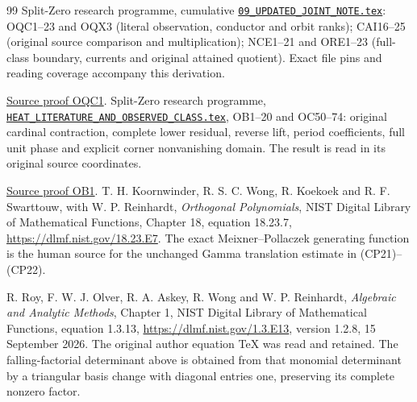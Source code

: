 \documentclass[11pt]{article}
\begin{document}
\begin{thebibliography}{99}
 Split-Zero research programme, cumulative
\href{https://github.com/KokunoYumeto/zeta-function-research-reader/blob/5992ad50c0f2a06921f1fcaded7b4e38097c0739/workbenches/splitzero-tandem/continuations/20260920-original-kernel-mixed-determinants/cumulative/09_UPDATED_JOINT_NOTE.tex\#L1}{\texttt{09\_UPDATED\_JOINT\_NOTE.tex}}: OQC1--23 and OQX3 (literal
observation, conductor and orbit ranks); CAI16--25 (original source
comparison and multiplication); NCE1--21 and ORE1--23 (full-class
boundary, currents and original attained quotient). Exact file pins
and reading coverage accompany this derivation.

\href{https://github.com/KokunoYumeto/zeta-function-research-reader/blob/5992ad50c0f2a06921f1fcaded7b4e38097c0739/workbenches/splitzero-tandem/continuations/20260920-original-kernel-mixed-determinants/cumulative/09_UPDATED_JOINT_NOTE.tex\#L11282}{Source proof OQC1}.
 Split-Zero research programme,
\href{https://github.com/KokunoYumeto/zeta-function-research-reader/blob/487253b5b01851da5b9b98af4e146fecf1fab902/workbenches/splitzero-tandem/continuations/20260920-heat-literature-observed-class/HEAT_LITERATURE_AND_OBSERVED_CLASS.tex\#L1}{\texttt{HEAT\_LITERATURE\_AND\_OBSERVED\_CLASS.tex}}, OB1--20 and
OC50--74: original cardinal contraction, complete lower residual,
reverse lift, period coefficients, full unit phase and explicit corner
nonvanishing domain. The result is read in its original source coordinates.

\href{https://github.com/KokunoYumeto/zeta-function-research-reader/blob/487253b5b01851da5b9b98af4e146fecf1fab902/workbenches/splitzero-tandem/continuations/20260920-heat-literature-observed-class/HEAT_LITERATURE_AND_OBSERVED_CLASS.tex\#L1223}{Source proof OB1}.
 T. H. Koornwinder, R. S. C. Wong, R. Koekoek and
R. F. Swarttouw, with W. P. Reinhardt, \emph{Orthogonal Polynomials},
NIST Digital Library of Mathematical Functions, Chapter 18,
equation 18.23.7, \url{https://dlmf.nist.gov/18.23.E7}.
The exact Meixner--Pollaczek generating function is the human source
for the unchanged Gamma translation estimate in (CP21)--(CP22).


 R. Roy, F. W. J. Olver, R. A. Askey,
R. Wong and W. P. Reinhardt, \emph{Algebraic and Analytic Methods},
Chapter 1, NIST Digital Library of Mathematical Functions,
equation 1.3.13, \url{https://dlmf.nist.gov/1.3.E13},
version 1.2.8, 15 September 2026. The original author equation TeX
was read and retained. The falling-factorial determinant above is
obtained from that monomial determinant by a triangular basis change
with diagonal entries one, preserving its complete nonzero factor.



\end{thebibliography}
\end{document}

